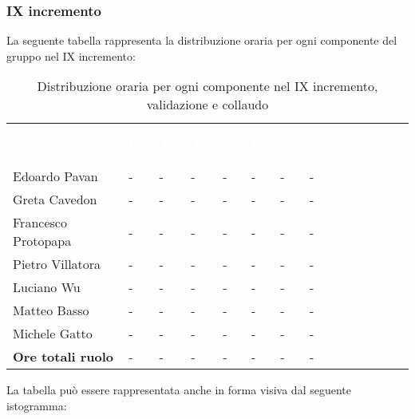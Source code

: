 \subsubsection{IX incremento}
La seguente tabella rappresenta la distribuzione oraria per ogni componente del gruppo nel IX incremento:
\begin{table}[!htbp]
\begin{center}
\renewcommand{\arraystretch}{1.25}
\begin{tabular}{ m{}<{\centering}  m{}<{\centering} m{}<{\centering} m{}<{\centering}  m{}<{\centering}  m{}<{\centering}  m{}<{\centering}  m{}<{\centering}   }
	\rowcolor{darkblue}
	\textcolor{white}{\textbf{Componente}} &\textcolor{white}{\textbf{Re}}&\textcolor{white}{\textbf{Ad}}&\textcolor{white}{\textbf{An}}&\textcolor{white}{\textbf{Pt}}&\textcolor{white}{\textbf{Pr}}&\textcolor{white}{\textbf{Ve}}&\textcolor{white}{\textbf{Ore complessive}}\\ 

	Edoardo Pavan & - & - & - & - & - & - & -\\	

	\rowcolor{gray!10} Greta Cavedon & - & - & - & - & - & - & -\\
	
	Francesco Protopapa & - & - & - & - & - & - & -\\
	
	\rowcolor{gray!10} Pietro Villatora & - & - & - & - & - & - & -\\
	
	Luciano Wu & - & - & - & - & - & - & -\\
	
	\rowcolor{gray!10} Matteo Basso & - & - & - & - & - & - & -\\
	
	Michele Gatto & - & - & - & - & - & - & -\\
	
	\rowcolor{gray!10} \textbf{Ore totali ruolo} & - & - & - & - & - & - & -\\

\end{tabular}
\caption{Distribuzione oraria per ogni componente nel IX incremento,  validazione e collaudo}
\end{center}
\end{table}

La tabella può essere rappresentata anche in forma visiva dal seguente istogramma:

